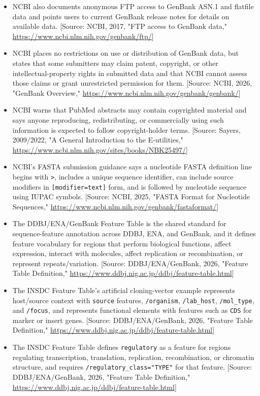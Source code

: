 \documentclass[11pt]{report}
\begin{document}
\begin{itemize}
\item NCBI also documents anonymous FTP access to GenBank ASN.1 and flatfile data and points users to current GenBank release notes for details on available data. [Source: NCBI, 2017, "FTP access to GenBank data," \url{https://www.ncbi.nlm.nih.gov/genbank/ftp/}]
\item NCBI places no restrictions on use or distribution of GenBank data, but states that some submitters may claim patent, copyright, or other intellectual-property rights in submitted data and that NCBI cannot assess those claims or grant unrestricted permission for them. [Source: NCBI, 2026, "GenBank Overview," \url{https://www.ncbi.nlm.nih.gov/genbank/genbank/}]
\item NCBI warns that PubMed abstracts may contain copyrighted material and says anyone reproducing, redistributing, or commercially using such information is expected to follow copyright-holder terms. [Source: Sayers, 2009/2022, "A General Introduction to the E-utilities," \url{https://www.ncbi.nlm.nih.gov/sites/books/NBK25497/}]
\item NCBI's FASTA submission guidance says a nucleotide FASTA definition line begins with \texttt{>}, includes a unique sequence identifier, can include source modifiers in \texttt{[modifier=text]} form, and is followed by nucleotide sequence using IUPAC symbols. [Source: NCBI, 2025, "FASTA Format for Nucleotide Sequences," \url{https://www.ncbi.nlm.nih.gov/genbank/fastaformat/}]
\item The DDBJ/ENA/GenBank Feature Table is the shared standard for sequence-feature annotation across DDBJ, ENA, and GenBank, and it defines feature vocabulary for regions that perform biological functions, affect expression, interact with molecules, affect replication or recombination, or represent repeats/variation. [Source: DDBJ/ENA/GenBank, 2026, "Feature Table Definition," \url{https://www.ddbj.nig.ac.jp/ddbj/feature-table.html}]
\item The INSDC Feature Table's artificial cloning-vector example represents host/source context with \texttt{source} features, \texttt{/organism}, \texttt{/lab\_host}, \texttt{/mol\_type}, and \texttt{/focus}, and represents functional elements with features such as \texttt{CDS} for marker or insert genes. [Source: DDBJ/ENA/GenBank, 2026, "Feature Table Definition," \url{https://www.ddbj.nig.ac.jp/ddbj/feature-table.html}]
\item The INSDC Feature Table defines \texttt{regulatory} as a feature for regions regulating transcription, translation, replication, recombination, or chromatin structure, and requires \texttt{/regulatory\_class="TYPE"} for that feature. [Source: DDBJ/ENA/GenBank, 2026, "Feature Table Definition," \url{https://www.ddbj.nig.ac.jp/ddbj/feature-table.html}]

\end{itemize}
\end{document}
